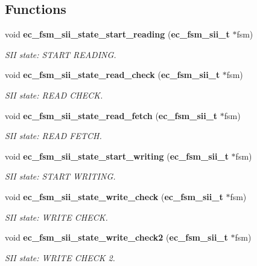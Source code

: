 \subsection*{Functions}
\begin{DoxyCompactItemize}
\item 
void {\bf ec\-\_\-fsm\-\_\-sii\-\_\-state\-\_\-start\-\_\-reading} ({\bf ec\-\_\-fsm\-\_\-sii\-\_\-t} $\ast$fsm)
\begin{DoxyCompactList}\small\item\em S\-I\-I state\-: S\-T\-A\-R\-T R\-E\-A\-D\-I\-N\-G. \end{DoxyCompactList}\item 
void {\bf ec\-\_\-fsm\-\_\-sii\-\_\-state\-\_\-read\-\_\-check} ({\bf ec\-\_\-fsm\-\_\-sii\-\_\-t} $\ast$fsm)
\begin{DoxyCompactList}\small\item\em S\-I\-I state\-: R\-E\-A\-D C\-H\-E\-C\-K. \end{DoxyCompactList}\item 
void {\bf ec\-\_\-fsm\-\_\-sii\-\_\-state\-\_\-read\-\_\-fetch} ({\bf ec\-\_\-fsm\-\_\-sii\-\_\-t} $\ast$fsm)
\begin{DoxyCompactList}\small\item\em S\-I\-I state\-: R\-E\-A\-D F\-E\-T\-C\-H. \end{DoxyCompactList}\item 
void {\bf ec\-\_\-fsm\-\_\-sii\-\_\-state\-\_\-start\-\_\-writing} ({\bf ec\-\_\-fsm\-\_\-sii\-\_\-t} $\ast$fsm)
\begin{DoxyCompactList}\small\item\em S\-I\-I state\-: S\-T\-A\-R\-T W\-R\-I\-T\-I\-N\-G. \end{DoxyCompactList}\item 
void {\bf ec\-\_\-fsm\-\_\-sii\-\_\-state\-\_\-write\-\_\-check} ({\bf ec\-\_\-fsm\-\_\-sii\-\_\-t} $\ast$fsm)
\begin{DoxyCompactList}\small\item\em S\-I\-I state\-: W\-R\-I\-T\-E C\-H\-E\-C\-K. \end{DoxyCompactList}\item 
void {\bf ec\-\_\-fsm\-\_\-sii\-\_\-state\-\_\-write\-\_\-check2} ({\bf ec\-\_\-fsm\-\_\-sii\-\_\-t} $\ast$fsm)
\begin{DoxyCompactList}\small\item\em S\-I\-I state\-: W\-R\-I\-T\-E C\-H\-E\-C\-K 2. \end{DoxyCompactList}\item 

\end{DoxyCompactItemize}
